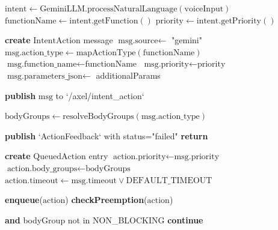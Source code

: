 \documentclass{article}
\begin{document}
\begin{algorithm}
\caption{AXEL Voice Command Processing Pipeline}
\begin{algorithmic}[1]

    \State $\text{intent} \gets \text{GeminiLLM.processNaturalLanguage}(\text{voiceInput})$
    \State $\text{functionName} \gets \text{intent.getFunction}()$ 
    \State $\text{priority} \gets \text{intent.getPriority}()$ 
    
    \State \textbf{create} $\text{IntentAction}$ message
    \State $\text{msg.source} \gets$ "gemini"
    \State $\text{msg.action\_type} \gets \text{mapActionType}(\text{functionName})$
    \State $\text{msg.function\_name} \gets \text{functionName}$
    \State $\text{msg.priority} \gets \text{priority}$
    \State $\text{msg.parameters\_json} \gets$ additionalParams
    
    \State \textbf{publish} $\text{msg}$ to `/axel/intent_action`
    
\EndProcedure

\newline

    \State $\text{bodyGroups} \gets \text{resolveBodyGroups}(\text{msg.action\_type})$
    
        \State \textbf{publish} `ActionFeedback` with status="failed"
        \State \textbf{return}
    \EndIf
    
    \State \textbf{create} $\text{QueuedAction}$ entry
    \State $\text{action.priority} \gets \text{msg.priority}$
    \State $\text{action.body\_groups} \gets \text{bodyGroups}$
    \State $\text{action.timeout} \gets \text{msg.timeout} \lor \text{DEFAULT\_TIMEOUT}$
    
    \State \textbf{enqueue}($\text{action}$) 
    \State \textbf{checkPreemption}($\text{action}$) 
    
\EndProcedure

\newline

 
         \textbf{and} bodyGroup not in NON\_BLOCKING
            \State \textbf{continue} 
        \EndIf
        

\end{algorithmic}
\end{algorithm}
\end{document}
